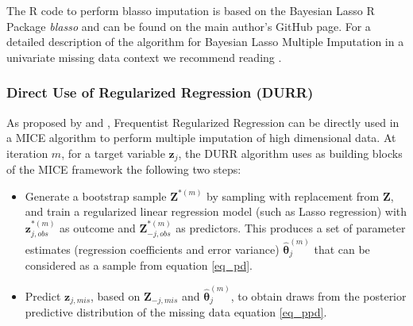 	The R code to perform blasso imputation is based on the Bayesian Lasso R Package \emph{blasso} \citep{blasso} and can 
	be found on the main author's GitHub page.
	For a detailed description of the algorithm for Bayesian Lasso Multiple Imputation in a univariate
	missing data context we recommend reading \cite{zhaoLong:2016}.

\subsubsection{Direct Use of Regularized Regression (DURR)}
	As proposed by \cite{zhaoLong:2016} and \cite{dengEtAl:2016}, Frequentist Regularized Regression can be 
	directly used in a MICE algorithm to perform multiple imputation of high dimensional data.
	At iteration $m$, for a target variable $\bm{z}_j$, the DURR algorithm uses as building blocks of the 
	MICE framework the following two steps:

	\begin{itemize}

	\item Generate a bootstrap sample $\bm{Z}^{*(m)}$ by sampling with replacement from $\bm{Z}$,
		and train a regularized linear regression model (such as Lasso regression) with
		$\bm{z}_{j,obs}^{*(m)}$ as outcome and $\bm{Z}_{-j,obs}^{*(m)}$ as predictors.
		This produces a set of parameter estimates (regression coefficients and error variance)
		$\hat{\bm{\theta}}_{j}^{(m)}$ that can be considered as a sample from equation \eqref{eq_pd}.

	\item Predict $\bm{z}_{j,mis}$, based on $\bm{Z}_{-j, mis}$ and $\hat{\bm{\theta}}_{j}^{(m)}$, 
		to obtain draws from the posterior predictive distribution of the missing data equation 
		\eqref{eq_ppd}.

	\end{itemize}

